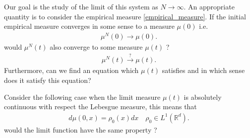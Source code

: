 Our goal is the study of the limit of this system as $N \to  \infty$. An appropriate quantity is to consider the empirical measure \ref{empirical_measure}.
If the initial empirical measure converges in some sense to a measure $\mu(0)$ i.e. 
\begin{align*}
  \mu^{N}(0) \to \mu(0)
.\end{align*}
would $\mu^N(t)$ also converge to some measure $\mu(t)$ ?
\begin{align*}
  \mu^N(t) \xrightarrow{?} \mu(t)
.\end{align*}
Furthermore, can we find an equation which $\mu(t)$ satisfies and in which sense does it satisfy this equation?\\[1ex]
\begin{note}
  Consider the following case when the limit measure $\mu(t)$ is absolutely continuous with respect the Lebesgue measure, this means that 
\begin{align*}
  d\mu(0,x) = \rho_0(x) dx \quad \rho_0 \in  L^{1}(\mathbb{R}^{d} ) 
.\end{align*}
would the limit function have the same property ?
\end{note}
\newpage

